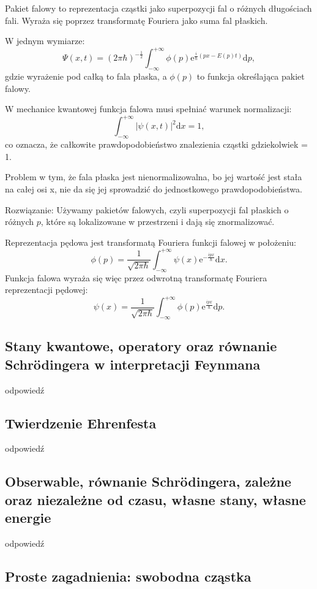 Pakiet falowy to reprezentacja cząstki jako superpozycji fal o różnych długościach fali. Wyraża się poprzez transformatę Fouriera jako suma fal płaskich.

W jednym wymiarze:
$$\Psi(x,t) = (2 \pi \hbar)^{-\frac12} \int_{-\infty}^{+\infty} \phi(p) \mathrm{e}^{\frac{i}{\hbar}\left(p x - E(p)t \right)} \mathrm{d}p,$$
gdzie wyrażenie pod całką to fala płaska, a $\phi(p)$ to funkcja określająca pakiet falowy.

W mechanice kwantowej funkcja falowa musi spełniać warunek normalizacji:
$$\int_{-\infty}^{+\infty} |\psi(x,t)|^2 \mathrm{d}x = 1,$$
co oznacza, że całkowite prawdopodobieństwo znalezienia cząstki gdziekolwiek = 1. 

Problem w tym, że fala płaska jest nienormalizowalna, bo jej wartość jest stała na całej osi x, nie da się jej sprowadzić do jednostkowego prawdopodobieństwa.

Rozwiązanie: Używamy pakietów falowych, czyli superpozycji fal płaskich o różnych $p$, które są lokalizowane w przestrzeni i dają się znormalizować.

Reprezentacja pędowa jest transformatą Fouriera funkcji falowej w położeniu:
$$\phi(p) = \frac{1}{\sqrt{2\pi \hbar}} \int_{-\infty}^{+\infty} \psi(x) \mathrm{e}^{-\frac{ipx}{\hbar}} \mathrm{d} x.$$
Funkcja falowa wyraża się więc przez odwrotną transformatę Fouriera reprezentacji pędowej:
$$\psi(x) = \frac{1}{\sqrt{2\pi \hbar}} \int_{-\infty}^{+\infty} \phi(p) \mathrm{e}^{\frac{ipx}{\hbar}} \mathrm{d} p.$$

\subsection{Stany kwantowe, operatory oraz równanie Schrödingera w interpretacji Feynmana}

odpowiedź

\subsection{Twierdzenie Ehrenfesta}

odpowiedź

\subsection{Obserwable, równanie Schrödingera, zależne oraz niezależne od czasu, własne stany, własne energie}

odpowiedź

\subsection{Proste zagadnienia: swobodna cząstka}


